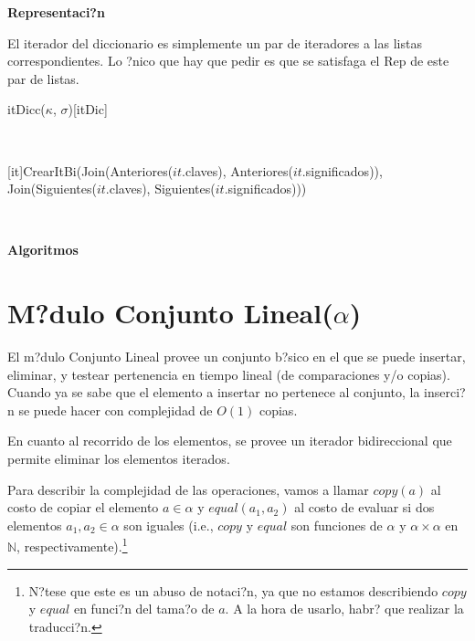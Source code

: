 \documentclass[a4paper,10pt]{article}
\newenvironment{Representacion}{%
  \vspace*{2ex}%
  \noindent\textbf{\Large Representaci?n}%
  \vspace*{2ex}%
}{}
\newenvironment{Algoritmos}{%
  \vspace*{2ex}%
  \noindent\textbf{\Large Algoritmos}%
  \vspace*{2ex}%
}{}
\begin{document}
\begin{Representacion}
  El iterador del diccionario es simplemente un par de iteradores a las listas correspondientes.  Lo ?nico que hay que pedir es que se satisfaga el Rep de este par de listas.

  \begin{Estructura}{itDicc($\kappa$, $\sigma$)}[itDic]
    \begin{Tupla}[itDic]%
    \end{Tupla}
  \end{Estructura}


  ~

  [it]{CrearItBi(Join(Anteriores($it$.claves), Anteriores($it$.significados)), \\\phantom{CrearItBi(}Join(Siguientes($it$.claves), Siguientes($it$.significados)))}\mbox{}

  ~


\end{Representacion}

\begin{Algoritmos}
  
\end{Algoritmos}

\section{M?dulo Conjunto Lineal($\alpha$)}
\label{sec:ConjuntoLineal}

El m?dulo Conjunto Lineal provee un conjunto b?sico en el que se puede insertar, eliminar, y testear pertenencia en tiempo lineal (de comparaciones y/o copias).  Cuando ya se sabe que el elemento a insertar no pertenece al conjunto, la inserci?n se puede hacer con complejidad de $O(1)$ copias.

En cuanto al recorrido de los elementos, se provee un iterador bidireccional que permite eliminar los elementos iterados.  

Para describir la complejidad de las operaciones, vamos a llamar $copy(a)$ al costo de copiar el elemento $a \in \alpha$ y $equal(a_1, a_2)$ al costo de evaluar si dos elementos $a_1, a_2 \in \alpha$ son iguales (i.e., $copy$ y $equal$ son funciones de $\alpha$ y $\alpha \times \alpha$ en $\mathbb{N}$, respectivamente).\footnote{N?tese que este es un abuso de notaci?n, ya que no estamos describiendo $copy$ y $equal$ en funci?n del tama?o de $a$.  A la hora de usarlo, habr? que realizar la traducci?n.}
\end{document}
